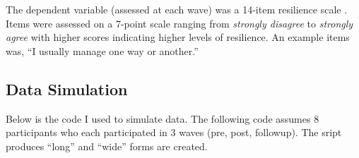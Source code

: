 \documentclass[
  11pt,
]{book}
\begin{document}
The dependent variable (assessed at each wave) was a 14-item resilience scale \citep{wagnild_development_1993}. Items were assessed on a 7-point scale ranging from \emph{strongly disagree} to \emph{strongly agree} with higher scores indicating higher levels of resilience. An example items was, ``I usually manage one way or another.''

\hypertarget{data-simulation-7}{%
\subsection*{Data Simulation}\label{data-simulation-7}}


Below is the code I used to simulate data. The following code assumes 8 participants who each participated in 3 waves (pre, post, followup). The sript produces ``long'' and ``wide'' forms are created.
\end{document}
